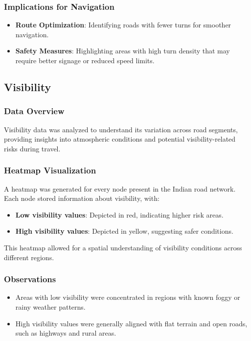 \subsubsection{Implications for Navigation}
\begin{itemize}
    \item \textbf{Route Optimization}: Identifying roads with fewer turns for smoother navigation.
    \item \textbf{Safety Measures}: Highlighting areas with high turn density that may require better signage or reduced speed limits.
\end{itemize}

\subsection{Visibility}
\subsubsection{Data Overview}
Visibility data was analyzed to understand its variation across road segments, providing insights into atmospheric conditions and potential visibility-related risks during travel.

\subsubsection{Heatmap Visualization}
A heatmap was generated for every node present in the Indian road network. Each node stored information about visibility, with:
\begin{itemize}
    \item \textbf{Low visibility values}: Depicted in red, indicating higher risk areas.
    \item \textbf{High visibility values}: Depicted in yellow, suggesting safer conditions.
\end{itemize}
This heatmap allowed for a spatial understanding of visibility conditions across different regions.

\subsubsection{Observations}
\begin{itemize}
    \item Areas with low visibility were concentrated in regions with known foggy or rainy weather patterns.
    \item High visibility values were generally aligned with flat terrain and open roads, such as highways and rural areas.
\end{itemize}

